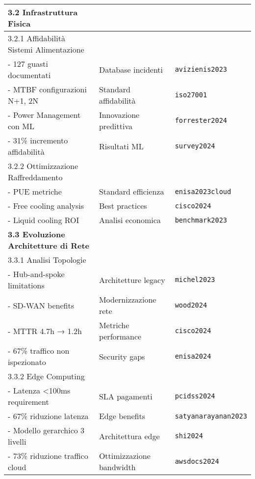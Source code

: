 \documentclass{article}
\begin{document}
\begin{longtable}{p{}|p{}|p{}}
\textbf{3.2 Infrastruttura Fisica} & & \\
\midrule
3.2.1 Affidabilità Sistemi Alimentazione & & \\
- 127 guasti documentati & Database incidenti & \texttt{avizienis2023} \\
- MTBF configurazioni N+1, 2N & Standard affidabilità & \texttt{iso27001} \\
- Power Management con ML & Innovazione predittiva & \texttt{forrester2024} \\
- 31\% incremento affidabilità & Risultati ML & \texttt{survey2024} \\
\midrule
3.2.2 Ottimizzazione Raffreddamento & & \\
- PUE metriche & Standard efficienza & \texttt{enisa2023cloud} \\
- Free cooling analysis & Best practices & \texttt{cisco2024} \\
- Liquid cooling ROI & Analisi economica & \texttt{benchmark2023} \\
\midrule

\textbf{3.3 Evoluzione Architetture di Rete} & & \\
\midrule
3.3.1 Analisi Topologie & & \\
- Hub-and-spoke limitations & Architetture legacy & \texttt{michel2023} \\
- SD-WAN benefits & Modernizzazione rete & \texttt{wood2024} \\
- MTTR 4.7h → 1.2h & Metriche performance & \texttt{cisco2024} \\
- 67\% traffico non ispezionato & Security gaps & \texttt{enisa2024} \\
\midrule
3.3.2 Edge Computing & & \\
- Latenza <100ms requirement & SLA pagamenti & \texttt{pcidss2024} \\
- 67\% riduzione latenza & Edge benefits & \texttt{satyanarayanan2023} \\
- Modello gerarchico 3 livelli & Architettura edge & \texttt{shi2024} \\
- 73\% riduzione traffico cloud & Ottimizzazione bandwidth & \texttt{awsdocs2024} \\
\midrule


\end{longtable}
\end{document}
